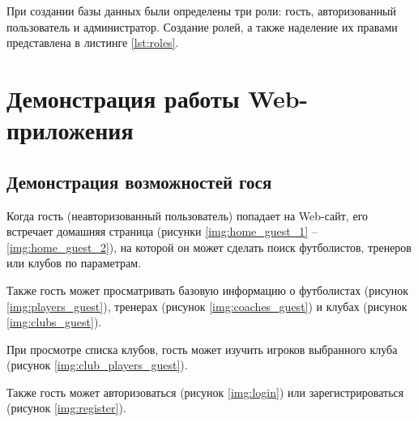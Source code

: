 При создании базы данных были определены три роли: гость, авторизованный пользователь и администратор. Создание ролей, а также наделение их правами представлена в листинге \ref{lst:roles}.


\clearpage

\section{Демонстрация работы Web-приложения}

\subsection{Демонстрация возможностей гося}

Когда гость (неавторизованный пользователь) попадает на Web-сайт, его встречает домашняя страница (рисунки \ref{img:home_guest_1} -- \ref{img:home_guest_2}), на которой он может сделать поиск футболистов, тренеров или клубов по параметрам.


\clearpage

Также гость может просматривать базовую информацию о футболистах (рисунок \ref{img:players_guest}), тренерах (рисунок \ref{img:coaches_guest}) и клубах (рисунок \ref{img:clubs_guest}).


\clearpage

При просмотре списка клубов, гость может изучить игроков выбранного клуба (рисунок \ref{img:club_players_guest}).


\clearpage

Также гость может авторизоваться (рисунок \ref{img:login}) или зарегистрироваться (рисунок \ref{img:register}).


\clearpage

